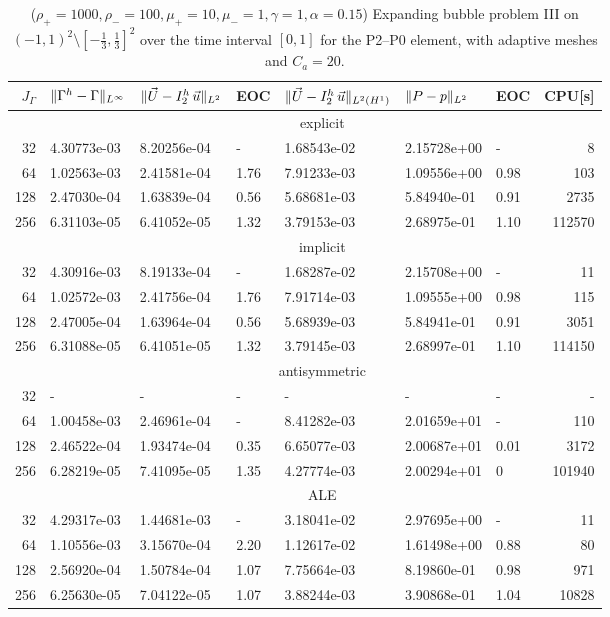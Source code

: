 \begin{table}
\center
\hspace*{-3.25cm}
\begin{tabular}{rllllllr}
\hline
$J_\Gamma$ & $\|\Gamma^h - \Gamma\|_{L^\infty}$ & $\|\vec U - I^h_{2}\,\vec u\|_{L^2}$ & EOC & $\|\vec U - I^h_{2}\,\vec u\|_{L^2(H^1)}$ & $\|P - p\|_{L^2}$ & EOC
& CPU[s] \\
\hline
& \multicolumn{7}{c}{explicit} \\
\hline
 32 & 4.30773e-03 & 8.20256e-04 &    - & 1.68543e-02 & 2.15728e+00 &    - &
8 \\
 64 & 1.02563e-03 & 2.41581e-04 & 1.76 & 7.91233e-03 & 1.09556e+00 & 0.98 &
103 \\
128 & 2.47030e-04 & 1.63839e-04 & 0.56 & 5.68681e-03 & 5.84940e-01 & 0.91 &
2735 \\
256 & 6.31103e-05 & 6.41052e-05 & 1.32 & 3.79153e-03 & 2.68975e-01 & 1.10 &
112570 \\
\hline
& \multicolumn{7}{c}{implicit} \\
\hline
 32 & 4.30916e-03 & 8.19133e-04 &    - & 1.68287e-02 & 2.15708e+00 &    - &
11 \\
 64 & 1.02572e-03 & 2.41756e-04 & 1.76 & 7.91714e-03 & 1.09555e+00 & 0.98 &
115 \\
128 & 2.47005e-04 & 1.63964e-04 & 0.56 & 5.68939e-03 & 5.84941e-01 & 0.91 &
3051 \\
256 & 6.31088e-05 & 6.41051e-05 & 1.32 & 3.79145e-03 & 2.68997e-01 & 1.10 &
114150 \\
\hline
& \multicolumn{7}{c}{antisymmetric} \\
\hline
 32 &           - &           - &    - &           - &           - &    - &
- \\
 64 & 1.00458e-03 & 2.46961e-04 &    - & 8.41282e-03 & 2.01659e+01 &    - &
110 \\
128 & 2.46522e-04 & 1.93474e-04 & 0.35 & 6.65077e-03 & 2.00687e+01 & 0.01 &
3172 \\
256 & 6.28219e-05 & 7.41095e-05 & 1.35 & 4.27774e-03 & 2.00294e+01 &    0 &
101940 \\
\hline
& \multicolumn{7}{c}{ALE} \\
\hline
 32 & 4.29317e-03 & 1.44681e-03 &    - & 3.18041e-02 & 2.97695e+00 &    - &
11 \\
 64 & 1.10556e-03 & 3.15670e-04 & 2.20 & 1.12617e-02 & 1.61498e+00 & 0.88 &
80 \\
128 & 2.56920e-04 & 1.50784e-04 & 1.07 & 7.75664e-03 & 8.19860e-01 & 0.98 &
971 \\
256 & 6.25630e-05 & 7.04122e-05 & 1.07 & 3.88244e-03 & 3.90868e-01 & 1.04 &
10828 \\
\hline
\end{tabular}
\hspace*{-3.25cm}
\caption[Navier--Stokes expanding bubble III errors P2--P0]
{($\rho_+ = 1000,\rho_- = 100,\mu_+ = 10,\mu_- =1,\gamma = 1,\alpha=0.15$)
Expanding bubble problem III on $(-1,1)^2\setminus[-\frac{1}{3},\frac{1}{3}]^2$
over the time interval $[0,1]$ for the P2--P0 element, with adaptive
meshes and $C_a=20$\textdegree.}
\label{tab:nsexpandingbubbleIIIp2p0}
\end{table}

